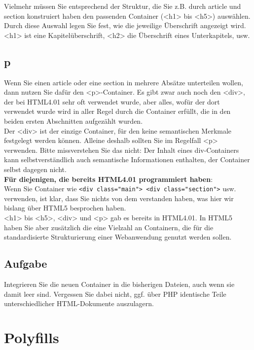 Vielmehr müssen Sie entsprechend der Struktur, die Sie z.B. durch article und section konstruiert haben den passenden Container (<h1> bis <h5>) auswählen. Durch diese Auswahl legen Sie fest, wie die jeweilige Überschrift angezeigt wird. <h1> ist eine Kapitelüberschrift, <h2> die Überschrift eines Unterkapitels, usw.

\subsection{p}

Wenn Sie einen article oder eine section in mehrere Absätze unterteilen wollen, dann nutzen Sie dafür den <p>-Container. Es gibt zwar auch noch den <div>, der bei HTML4.01 sehr oft verwendet wurde, aber alles, wofür der dort verwendet wurde wird in aller Regel durch die Container erfüllt, die in den beiden ersten Abschnitten aufgezählt wurden.\\

Der <div> ist der einzige Container, für den keine semantischen Merkmale festgelegt werden können. Alleine deshalb sollten Sie im Regelfall <p> verwenden. Bitte missverstehen Sie das nicht: Der Inhalt eines div-Containers kann selbstverständlich auch semantische Informationen enthalten, der Container selbst dagegen nicht.\\

\textbf{Für diejenigen, die bereits HTML4.01 programmiert haben}:\\

Wenn Sie Container wie \verb|<div class="main"> <div class="section">| usw. verwenden, ist klar, dass Sie nichts von dem verstanden haben, was hier wir bislang über HTML5 besprochen haben.\\

<h1> bis <h5>, <div> und <p> gab es bereits in HTML4.01. In HTML5 haben Sie aber zusätzlich die eine Vielzahl an Containern, die für die standardisierte Strukturierung einer Webanwendung genutzt werden sollen.

\subsection{Aufgabe}

Integrieren Sie die neuen Container in die bisherigen Dateien, auch wenn sie damit leer sind. Vergessen Sie dabei nicht, ggf. über PHP identische Teile unterschiedlicher HTML-Dokumente auszulagern.

\section{Polyfills}

